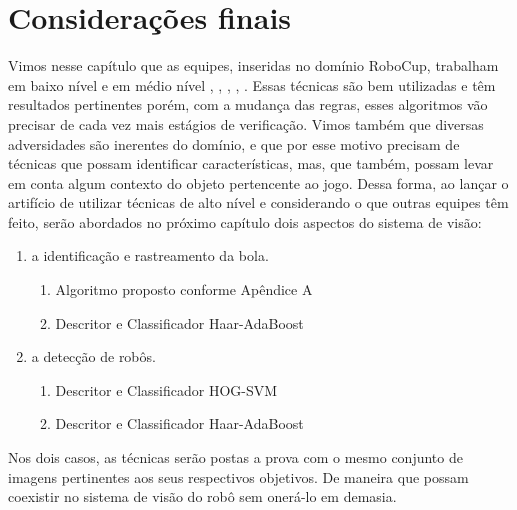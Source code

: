 \section{Considerações finais}

Vimos nesse capítulo que as equipes, inseridas no domínio RoboCup, trabalham em baixo nível e em médio nível \cite{AUTMan}, \cite{Bold}, \cite{CIT}, \cite{Baset}, \cite{EROS}. Essas técnicas são bem utilizadas e têm resultados pertinentes porém, com a mudança das regras, esses algoritmos vão precisar de cada vez mais estágios de verificação. Vimos também que diversas adversidades são inerentes do domínio, e que por esse motivo precisam de técnicas que possam identificar características, mas, que também, possam levar em conta algum contexto do objeto pertencente ao jogo.
Dessa forma, ao lançar o artifício de utilizar técnicas de alto nível e considerando o que outras equipes têm feito, serão abordados no próximo capítulo dois aspectos do sistema de visão: 

\begin{enumerate}
	\item a identificação e rastreamento da bola.
		\begin{enumerate}
			\item Algoritmo proposto conforme Apêndice A
			\item Descritor e Classificador Haar-AdaBoost
		\end{enumerate}
	\item a detecção de robôs.
		\begin{enumerate}
			\item Descritor e Classificador HOG-SVM
			\item Descritor e Classificador Haar-AdaBoost
		\end{enumerate}
\end{enumerate}

Nos dois casos, as técnicas serão postas a prova com o mesmo conjunto de imagens pertinentes aos seus respectivos objetivos. De maneira que possam coexistir no sistema de visão do robô sem onerá-lo em demasia.


